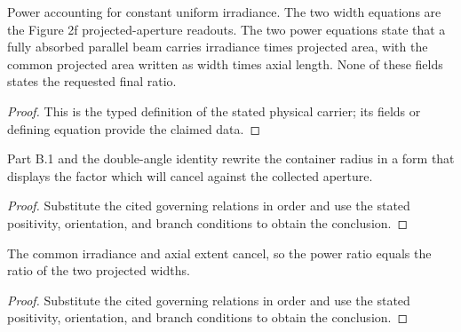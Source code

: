 \begin{definition}
  \label{def:physics:IPhO_2026_2_B_2:aux010}
  Power accounting for constant uniform irradiance. The two width equations are the Figure 2f projected-aperture readouts. The two power equations state that a fully absorbed parallel beam carries irradiance times projected area, with the common projected area written as width times axial length. None of these fields states the requested final ratio.
\end{definition}
\begin{proof}
  This is the typed definition of the stated physical carrier; its fields or defining equation provide the claimed data.
\end{proof}

\begin{lemma}
  \label{lem:physics:IPhO_2026_2_B_2:aux011}
  Part B.1 and the double-angle identity rewrite the container radius in a form that displays the factor which will cancel against the collected aperture.
\end{lemma}
\begin{proof}
  Substitute the cited governing relations in order and use the stated positivity, orientation, and branch conditions to obtain the conclusion.
\end{proof}

\begin{lemma}
  \label{lem:physics:IPhO_2026_2_B_2:aux012}
  The common irradiance and axial extent cancel, so the power ratio equals the ratio of the two projected widths.
\end{lemma}
\begin{proof}
  Substitute the cited governing relations in order and use the stated positivity, orientation, and branch conditions to obtain the conclusion.
\end{proof}
